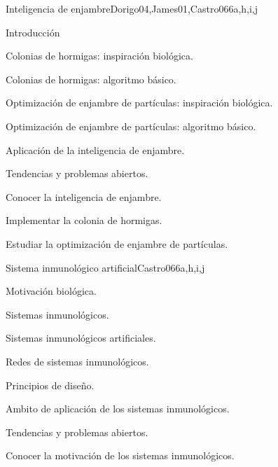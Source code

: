 \begin{syllabus}
\begin{unit}{Inteligencia de enjambre}{Dorigo04,James01,Castro06}{6}{a,h,i,j}
\begin{topics}
        \item Introducción
        \item Colonias de hormigas: inspiración biológica.
        \item Colonias de hormigas: algoritmo básico.
        \item Optimización de enjambre de partículas: inspiración biológica.
        \item Optimización de enjambre de partículas: algoritmo básico.
        \item Aplicación de la inteligencia de enjambre.
        \item Tendencias y problemas abiertos.
    \end{topics}
    \begin{learningoutcomes}
        \item Conocer la inteligencia de enjambre.
        \item Implementar la colonia de hormigas.
        \item Estudiar la optimización de enjambre de partículas.
    \end{learningoutcomes}
\end{unit}

\begin{unit}{Sistema inmunológico artificial}{Castro06}{6}{a,h,i,j}
\begin{topics}
        \item Motivación biológica.
        \item Sistemas inmunológicos.
        \item Sistemas inmunológicos artificiales.
        \item Redes de sistemas inmunológicos.
        \item Principios de diseño.
        \item Ambito de aplicación de los sistemas inmunológicos.
        \item Tendencias y problemas abiertos.
    \end{topics}
    \begin{learningoutcomes}
        \item Conocer la motivación de los sistemas inmunológicos.
    \end{learningoutcomes}
\end{unit}


\end{syllabus}
